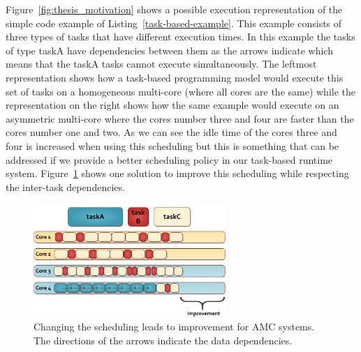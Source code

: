 Figure~\ref{fig:thesis_motivation} shows a possible execution representation of the simple code example of Listing~\ref{task-based-example}.
This example consists of three types of tasks that have different execution times.
In this example the tasks of type taskA have dependencies between them as the arrows indicate which means that the taskA tasks cannot execute simultaneously.
The leftmost representation shows how a task-based programming model would execute this set of tasks on a homogeneous multi-core (where all cores are the same) while the representation on the right shows how the same example would execute on an asymmetric multi-core where the cores number three and four are faster than the cores number one and two.
As we can see the idle time of the cores three and four is increased when using this scheduling but this is something that can be addressed if we provide a better scheduling policy in our task-based runtime system.
Figure~\ref{fig:thesis_motivation2} shows one solution to improve this scheduling while respecting the inter-task dependencies.
\begin{figure}[t]%
	\centering
	\includegraphics[width=0.65\textwidth]{figures/thesis_motivation2.pdf}
	\caption{Changing the scheduling leads to improvement for AMC systems. The directions of the arrows indicate the data dependencies.}
	\label{fig:thesis_motivation2}
\end{figure}

